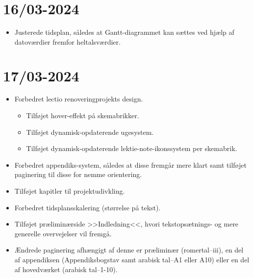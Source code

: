 \documentclass[12pt, a4paper]{article}
\begin{document}
    \section{16/03-2024}
        \begin{itemize}
            \item Justerede tidsplan, således at Gantt-diagrammet kan sættes ved hjælp af datoværdier fremfor heltalsværdier.
        \end{itemize}

    \section{17/03-2024}
        \begin{itemize}
            \item Forbedret lectio renoveringprojekts design.
            \begin{itemize}
                \item Tilføjet hover-effekt på skemabrikker.
                \item Tilføjet dynamisk-opdaterende ugesystem.
                \item Tilføjet dynamisk-opdaterende lektie-note-ikonssystem per skemabrik.
            \end{itemize}
            \item Forbedret appendiks-system, således at disse fremgår mere klart samt tilføjet paginering til disse for nemme orientering.
            \item Tilføjet kapitler til projektudivkling.
            \item Forbedret tidsplansskalering (størrelse på tekst).
            \item Tilføjet præliminærside >>Indledning<<, hvori tekstopsætnings- og mere generelle overvejelser vil fremgå.
            \item Ændrede paginering afhængigt af denne er præliminær (romertal--iii), en del af appendiksen (Appendiksbogstav samt arabisk tal--A1 eller A10) eller en del af hovedværket (arabisk tal--1-10).
        \end{itemize}
\end{document}
